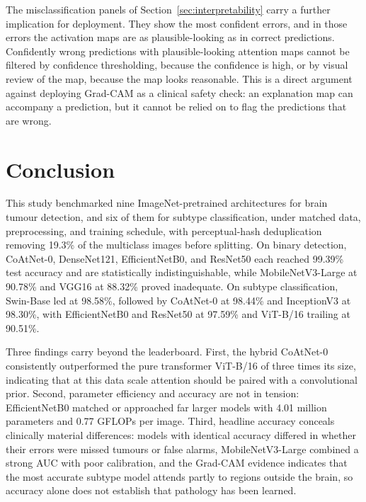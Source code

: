 \documentclass[final,3p,times,number]{elsarticle}
\begin{document}
The misclassification panels of Section~\ref{sec:interpretability} carry a further implication for deployment. They show the most confident errors, and in those errors the activation maps are as plausible-looking as in correct predictions. Confidently wrong predictions with plausible-looking attention maps cannot be filtered by confidence thresholding, because the confidence is high, or by visual review of the map, because the map looks reasonable. This is a direct argument against deploying Grad-CAM as a clinical safety check: an explanation map can accompany a prediction, but it cannot be relied on to flag the predictions that are wrong.

\section{Conclusion}
\label{sec:conclusion}

This study benchmarked nine ImageNet-pretrained architectures for brain tumour detection, and six of them for subtype classification, under matched data, preprocessing, and training schedule, with perceptual-hash deduplication removing 19.3\% of the multiclass images before splitting. On binary detection, CoAtNet-0, DenseNet121, EfficientNetB0, and ResNet50 each reached 99.39\% test accuracy and are statistically indistinguishable, while MobileNetV3-Large at 90.78\% and VGG16 at 88.32\% proved inadequate. On subtype classification, Swin-Base led at 98.58\%, followed by CoAtNet-0 at 98.44\% and InceptionV3 at 98.30\%, with EfficientNetB0 and ResNet50 at 97.59\% and ViT-B/16 trailing at 90.51\%.

Three findings carry beyond the leaderboard. First, the hybrid CoAtNet-0 consistently outperformed the pure transformer ViT-B/16 of three times its size, indicating that at this data scale attention should be paired with a convolutional prior. Second, parameter efficiency and accuracy are not in tension: EfficientNetB0 matched or approached far larger models with 4.01 million parameters and 0.77 GFLOPs per image. Third, headline accuracy conceals clinically material differences: models with identical accuracy differed in whether their errors were missed tumours or false alarms, MobileNetV3-Large combined a strong AUC with poor calibration, and the Grad-CAM evidence indicates that the most accurate subtype model attends partly to regions outside the brain, so accuracy alone does not establish that pathology has been learned.
\end{document}
